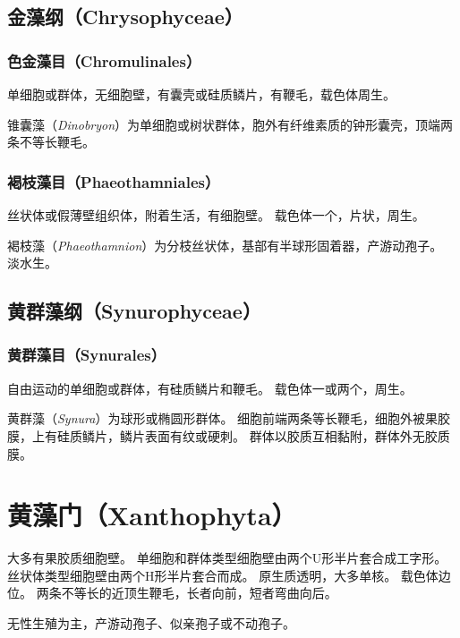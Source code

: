 \documentclass[11pt]{article}
\begin{document}
\subsection{金藻纲（Chrysophyceae）}
\subsubsection{色金藻目（Chromulinales）}
单细胞或群体，无细胞壁，有囊壳或硅质鳞片，有鞭毛，载色体周生。

\par

锥囊藻（\textit{Dinobryon}）为单细胞或树状群体，胞外有纤维素质的钟形囊壳，顶端两条不等长鞭毛。

\subsubsection{褐枝藻目（Phaeothamniales）}
丝状体或假薄壁组织体，附着生活，有细胞壁。
载色体一个，片状，周生。

\par

褐枝藻（\textit{Phaeothamnion}）为分枝丝状体，基部有半球形固着器，产游动孢子。
淡水生。

\subsection{黄群藻纲（Synurophyceae）}
\subsubsection{黄群藻目（Synurales）}
自由运动的单细胞或群体，有硅质鳞片和鞭毛。
载色体一或两个，周生。

\par

黄群藻（\textit{Synura}）为球形或椭圆形群体。
细胞前端两条等长鞭毛，细胞外被果胶膜，上有硅质鳞片，鳞片表面有纹或硬刺。
群体以胶质互相黏附，群体外无胶质膜。

\section{黄藻门（Xanthophyta）}
大多有果胶质细胞壁。
单细胞和群体类型细胞壁由两个U形半片套合成工字形。
丝状体类型细胞壁由两个H形半片套合而成。
原生质透明，大多单核。
载色体边位。
两条不等长的近顶生鞭毛，长者向前，短者弯曲向后。

\par

无性生殖为主，产游动孢子、似亲孢子或不动孢子。
\end{document}
